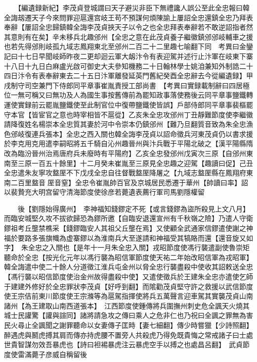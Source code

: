 　　【編遺録新紀】李茂貞登城謂曰天子避災非臣下無禮讒人誤公至此全忠報曰韓全誨刼遷天子今來問罪迎扈還宫岐王苟不預謀何煩陳諭上屢詔全忠還鎮全忠乃拜表奉辭【屢詔全忠歸鎮韓全誨李茂貞挾天子以令之也全忠拜表奉辭若不敢逆詔指者然其意則有在矣】辛未移兵北趣邠州【全忠之意在此茂貞養子繼徽鎮邠邠岐輔車之援也若先得邠則岐孤九域志鳳翔東北至邠州二百二十二里趣七喻翻下同　考異曰金鑾記曰十七日早聞岐師昨夜二更却迴云軍大衂汴令有表迎駕并述行止汴軍在岐東下寨十八日十九日白麻盧光啟可御史大夫參知機務二十日翰林學士姚洎兼知外制誥二十四日汴令有表奉辭東去二十五日汴軍離發延英門舊紀癸酉全忠辭去今從編遺録】甲戌制守司空兼門下侍郎同平章事崔胤責授工部尚書　【考異曰實録載制辭曰四居極位一無可稱又曰無功及人為國生事按舊傳前為罷知政事落使務後云同平章事鹽鐵轉運使實録前云罷胤鹽鐵使至此制官位中復帶鹽鐵使皆誤】戶部侍郎同平章事裴樞罷守本官【皆宦官之意也時宰相皆不扈從】乙亥朱全忠攻邠州丁丑靜難節度使李繼徽請降復姓名楊崇本全忠質其妻於河中令崇本仍鎮邠州【難乃旦翻質音致為朱全忠漁色邠岐復連兵張本】全忠之西入關也韓全誨李茂貞以詔命徵兵河東茂貞仍以書求援於李克用克用遣李嗣昭將五千騎自沁州趣晉州與汴兵戰于平陽北破之【漢平陽縣隋改為臨汾晉州治焉唐府兵未廢時有平陽府】乙亥全忠發邠州戊寅次三原【自邠州東南至三原一百五十餘里】十二月癸未崔胤至三原見全忠趣之迎駕【趣讀曰促】己丑全忠遣朱友寧攻盩厔不下戊戌全忠自往督戰盩厔降屠之【九域志盩厔縣在鳳翔府東南二百里盩音厔音窒】全忠令崔胤帥百官及京城居民悉遷于華州【帥讀曰率】詔以裴贄充大明宫留守清海節度使徐彦若薨遺表薦行軍司馬劉隱權留

　　後【劉隱始得廣州】　李神福知錢鏐定不死【或言錢鏐為盜所殺見上文八月】而臨安城堅久攻不拔欲歸恐為鏐所邀【自臨安退還宣州有千秋嶺之險】乃遣人守衛鏐祖考丘壟禁樵采【錢鏐臨安人其祖父丘壟在焉】又使顧全武通家信鏐遣使謝之神福於要路多張旗幟為虚寨鏐以為淮南兵大至遂請和神福受其犒賂而還【還音旋又如字】　朱全忠之入關也【是年十一月朱全忠入關】戎昭節度使馮行襲遣副使魯崇矩聽命於全忠【按光化元年以馮行襲為昭信軍節度使天祐二年始改昭信軍為戎昭軍】韓全誨遣中使二十餘人分道徵江淮兵屯金州以脅全忠行襲盡殺中使收其詔敕送全忠【馮行襲以昭信節度使治金州故得盡殺中使】又遣使徵兵於王建朱全忠亦遣使乞師于建建外修好於全忠罪狀李茂貞【好呼到翻】而隂勸茂貞堅守許之救援以武信節度使王宗佶前東川節度使王宗滌等為扈駕指揮使將兵五萬聲言迎車駕其實襲茂貞山南諸州【為王建取山南西道張本】　江西節度使鍾傳將兵圍撫州刺史危全諷天火燒其城士民讙驚【讙與諠同】諸將請急攻之傳曰乘人之危非仁也乃祝曰全諷之罪無為害民火尋止全諷聞之謝罪聽命以女妻傳子匡時【妻七細翻】傳少時嘗獵【少詩照翻】醉遇虎與鬭虎搏其肩而傳亦持虎腰不置旁人共殺虎乃得免既貴悔之常戒諸子曰士處世貴智謀勿效吾暴虎也【詩曰袒裼暴虎注云暴虎空手以搏之也處昌呂翻】　武貞節度使雷滿薨子彦威自稱留後

